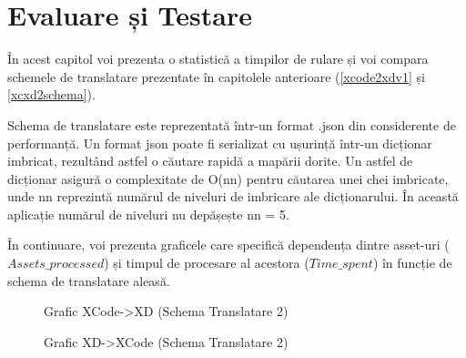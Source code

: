\chapter{Evaluare și Testare}

În acest capitol voi prezenta o statistică a timpilor de rulare și voi compara schemele de translatare prezentate în capitolele anterioare (\ref{xcode2xdv1} și \ref{xcxd2schema}).

Schema de translatare este reprezentată într-un format .json din considerente de performanță. Un format json poate fi serializat cu ușurință într-un dicționar imbricat, rezultând astfel o căutare rapidă a mapării dorite. Un astfel de dicționar asigură o complexitate de O(nn) pentru căutarea unei chei imbricate, unde nn reprezintă numărul de niveluri de imbricare ale dicționarului. În această aplicație numărul de niveluri nu depășește nn = 5.  

În continuare, voi prezenta graficele care specifică dependența dintre asset-uri ($Assets\_processed$) și timpul de procesare al acestora ($Time\_spent$) în funcție de schema de translatare aleasă.

\begin{figure}[!htbp]
\centering
\caption{Grafic XCode->XD (Schema Translatare 2)} \label{fig:Grafic1}
\end{figure}

\begin{figure}[!htbp]
\centering
{}
\caption{Grafic XD->XCode (Schema Translatare 2)} \label{fig:Grafic1}
\end{figure}

